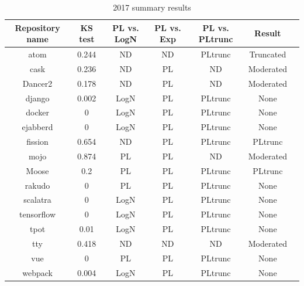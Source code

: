 \documentclass[conference]{IEEEtran}
\begin{document}
\begin{table}[htbp]
	\caption{2017 summary results}
\begin{center}
	\begin{tabular}{| c |c| c | c| c |c | c |}
		\hline
		Repository name & KS test & PL vs. LogN & PL vs. Exp & PL vs. PLtrunc & Result \\ 
		\hline
		atom & 0.244 &ND & ND &PLtrunc & Truncated \\ 
		cask & 0.236 &ND & PL & ND & Moderated \\
		Dancer2 &0.178 &ND &PL &ND & Moderated \\
		django &0.002 &LogN &PL &PLtrunc &None\\
		docker &0 &LogN &PL &PLtrunc &None\\
		ejabberd &0 &LogN &PL &PLtrunc &None\\
		fission &0.654 &ND &PL &PLtrunc &PLtrunc\\
		mojo &0.874 &PL &PL &ND & Moderated \\
		Moose &0.2 &PL &PL &PLtrunc & PLtrunc\\
		rakudo &0 &PL &PL &PLtrunc & None\\
		scalatra &0 &LogN &PL &PLtrunc & None\\
		tensorflow &0 &LogN &PL &PLtrunc & None\\
		tpot &0.01 &LogN &PL &PLtrunc &None\\
		tty &0.418 &ND &ND &ND & Moderated \\
		vue &0 &PL &PL &PLtrunc & None\\
		webpack &0.004 &LogN &PL & PLtrunc & None\\
		\hline
	\end{tabular}
\end{center}
\label{tab:2017tests}
\end{table}

\end{document}
